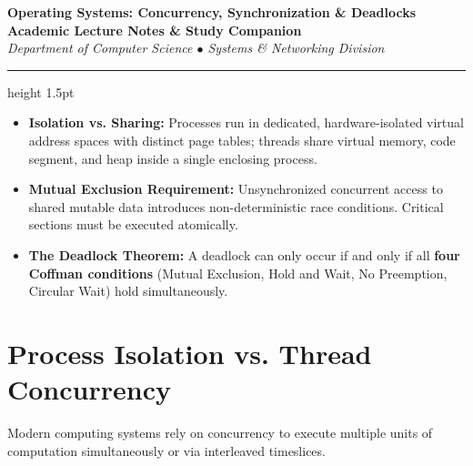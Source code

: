 \documentclass[11pt,a4paper]{article}
\begin{document}
\begin{center}
    {\Huge \textbf{Operating Systems: Concurrency, Synchronization \& Deadlocks}}\\[6pt]
    {\large \textbf{Academic Lecture Notes \& Study Companion}}\\[4pt]
    \textit{Department of Computer Science $\bullet$ Systems \& Networking Division}
    \vspace{8pt}
    \hrule height 1.5pt
    \vspace{12pt}
\end{center}

\begin{tcolorbox}[title=Core Conceptual Takeaways]
\begin{itemize}[leftmargin=1.5em, itemsep=2pt]
    \item \textbf{Isolation vs. Sharing:} Processes run in dedicated, hardware-isolated virtual address spaces with distinct page tables; threads share virtual memory, code segment, and heap inside a single enclosing process.
    \item \textbf{Mutual Exclusion Requirement:} Unsynchronized concurrent access to shared mutable data introduces non-deterministic race conditions. Critical sections must be executed atomically.
    \item \textbf{The Deadlock Theorem:} A deadlock can only occur if and only if all \textbf{four Coffman conditions} (Mutual Exclusion, Hold and Wait, No Preemption, Circular Wait) hold simultaneously.
\end{itemize}
\end{tcolorbox}

\vspace{10pt}

\section{Process Isolation vs. Thread Concurrency}

Modern computing systems rely on concurrency to execute multiple units of computation simultaneously or via interleaved timeslices.
\end{document}
